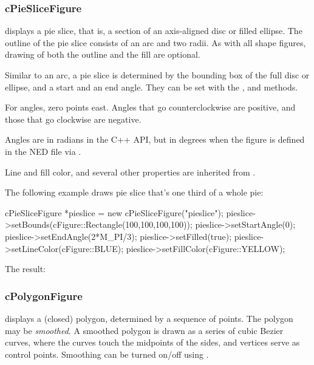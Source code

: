 \subsubsection{cPieSliceFigure}
\label{sec:graphics:pieslicefigure}

 displays a pie slice, that is, a section of an
axis-aligned disc or filled ellipse.  The outline of the pie slice consists
of an arc and two radii. As with all shape figures, drawing of both the
outline and the fill are optional.

Similar to an arc, a pie slice is determined by the bounding box of the
full disc or ellipse, and a start and an end angle. They can be set with
the ,  and 
methods.

For angles, zero points east. Angles that go counterclockwise are
positive, and those that go clockwise are negative.

\begin{note}
Angles are in radians in the C++ API, but in degrees when the figure is
defined in the NED file via .
\end{note}

Line and fill color, and several other properties are inherited from
.

The following example draws pie slice that's one third of a whole pie:

\begin{cpp}
cPieSliceFigure *pieslice = new cPieSliceFigure("pieslice");
pieslice->setBounds(cFigure::Rectangle(100,100,100,100));
pieslice->setStartAngle(0);
pieslice->setEndAngle(2*M_PI/3);
pieslice->setFilled(true);
pieslice->setLineColor(cFigure::BLUE);
pieslice->setFillColor(cFigure::YELLOW);
\end{cpp}


The result:

\begin{center}

\end{center}


\subsubsection{cPolygonFigure}
\label{sec:graphics:polygonfigure}

 displays a (closed) polygon, determined by a sequence of points.
The polygon may be \textit{smoothed}. A smoothed polygon is drawn as a series
of cubic Bezier curves, where the curves touch the midpoints of the sides,
and vertices serve as control points. Smoothing can be turned on/off
using .


